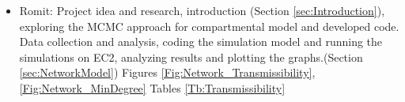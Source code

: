 \documentclass[10pt, journal,onecolumn]{IEEEtran}
\begin{document}
\begin{appendix}
\begin{itemize}
\item {Romit: } Project idea and research, introduction (Section \ref{sec:Introduction}), exploring the MCMC approach for compartmental model  and developed code.
Data collection and analysis, coding the simulation model and running the simulations on EC2, analyzing results and plotting the graphs.(Section \ref{sec:NetworkModel})
Figures \ref{Fig:Network_Transmissibility}, \ref{Fig:Network_MinDegree}
Tables \ref{Tb:Transmissibility}
\end{itemize}

\end{appendix}
\end{document}

